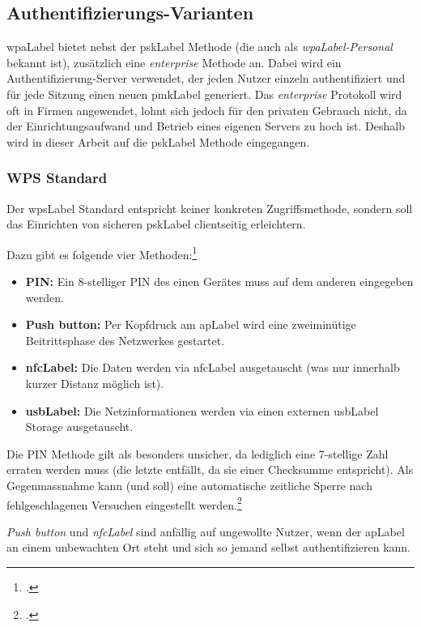 \subsection{Authentifizierungs-Varianten}
\gls{wpaLabel} bietet nebst der \gls{pskLabel} Methode (die auch als \textit{\gls{wpaLabel}-Personal} bekannt ist), zusätzlich eine \textit{enterprise} Methode an.
Dabei wird ein Authentifizierung-Server verwendet, der jeden Nutzer einzeln authentifiziert und für jede Sitzung einen neuen \gls{pmkLabel} generiert.
Das \textit{enterprise} Protokoll wird oft in Firmen angewendet, lohnt sich jedoch für den privaten Gebrauch nicht, da der Einrichtungsaufwand und Betrieb eines eigenen Servers zu hoch ist.
Deshalb wird in dieser Arbeit auf die \gls{pskLabel} Methode eingegangen.


\subsubsection{WPS Standard}
Der \gls{wpsLabel} Standard entspricht keiner konkreten Zugriffsmethode, sondern soll das Einrichten von sicheren \gls{pskLabel} clientseitig erleichtern.

Dazu gibt es folgende vier Methoden:\footcite{Wi-Fi_Protected_Setup_-_Wikipedia_the_free_encyclopedia_2015-04-10}
\begin{itemize}
	\item \textbf{PIN:} Ein 8-stelliger PIN des einen Gerätes muss auf dem anderen eingegeben werden.
	\item \textbf{Push button:} Per Kopfdruck am \gls{apLabel} wird eine zweiminütige Beitrittsphase des Netzwerkes gestartet.
	\item \textbf{\gls{nfcLabel}:} Die Daten werden via \gls{nfcLabel} ausgetauscht (was nur innerhalb kurzer Distanz möglich ist).
	\item \textbf{\gls{usbLabel}:} Die Netzinformationen werden via einen externen \gls{usbLabel} Storage ausgetauscht.
\end{itemize}

Die PIN Methode gilt als besonders unsicher, da lediglich eine 7-stellige Zahl erraten werden muss (die letzte entfällt, da sie einer Checksumme entspricht).
Als Gegenmassnahme kann (und soll) eine automatische zeitliche Sperre nach fehlgeschlagenen Versuchen eingestellt werden.\footcite{viehboeck_wps_2015-04-10}

\textit{Push button} und \textit{\gls{nfcLabel}} sind anfällig auf ungewollte Nutzer, wenn der \gls{apLabel} an einem unbewachten Ort steht und sich so jemand selbst authentifizieren kann.


